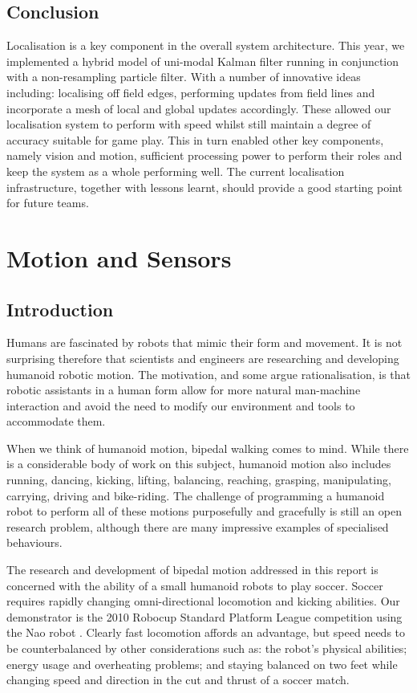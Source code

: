 \documentclass[pdftex,11pt,a4paper]{report}
\begin{document}
\section{Conclusion}
Localisation is a key component in the overall system architecture. This year, we implemented a hybrid model of uni-modal Kalman filter running in conjunction with a non-resampling particle filter. With a number of innovative ideas including: localising off field edges, performing updates from field lines and incorporate a mesh of local and global updates accordingly. These allowed our localisation system to perform with speed whilst still maintain a degree of accuracy suitable for game play. This in turn enabled other key components, namely vision and motion, sufficient processing power to perform their roles and keep the system as a whole performing well. The current localisation infrastructure, together with lessons learnt, should provide a good starting point for future teams.
	
\newpage
\chapter{Motion and Sensors}
\section{Introduction}\label{sectionMotion}
Humans are fascinated by robots that mimic their form and movement. It is not surprising therefore that scientists and engineers are researching and developing  humanoid robotic motion. The motivation, and some argue rationalisation, is that robotic assistants in a human form allow for more natural man-machine interaction and avoid the need to modify our environment and tools to accommodate them.  

When we think of humanoid motion, bipedal walking comes to mind. While there is a considerable body of work on this subject, humanoid motion also includes running, dancing, kicking, lifting, balancing, reaching, grasping, manipulating, carrying, driving and bike-riding. The challenge of programming a humanoid robot to perform all of these motions purposefully and gracefully is still an open research problem, although there are many impressive examples of specialised behaviours.

The research and development of bipedal motion addressed in this report is concerned with the ability of a small humanoid robots to play soccer. Soccer requires rapidly changing omni-directional locomotion and kicking abilities. Our demonstrator is the 2010 Robocup Standard Platform League competition using the Nao robot \cite{aldebaran10developer}. Clearly fast locomotion affords an advantage, but speed needs to be counterbalanced by other considerations such as: the robot's physical abilities; energy usage and overheating problems; and staying balanced on two feet while changing speed and direction in the cut and thrust of a soccer match. 
\end{document}
